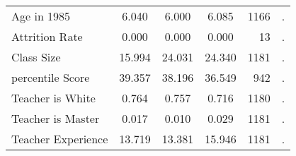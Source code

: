 \documentclass{article}
\begin{document}
\begin{table}[htbp]
\begin{tabular}{llcccrc}
    \multicolumn{2}{l}{Age in 1985} & 6.040  & 6.000  & 6.085  & 1166  & . \\
    \multicolumn{2}{l}{Attrition Rate} & 0.000  & 0.000  & 0.000  & 13    & . \\
    \multicolumn{2}{l}{Class Size} & 15.994  & 24.031  & 24.340  & 1181  & . \\
    \multicolumn{2}{l}{percentile Score} & 39.357  & 38.196  & 36.549  & 942   & . \\
    \multicolumn{2}{l}{Teacher is White} & 0.764  & 0.757  & 0.716  & 1180  & . \\
    \multicolumn{2}{l}{Teacher is Master} & 0.017  & 0.010  & 0.029  & 1181  & . \\
    \multicolumn{2}{l}{Teacher Experience} & 13.719  & 13.381  & 15.946  & 1181  & . \\
    \bottomrule
    \bottomrule
    \end{tabular}%
  \label{tab:addlabel}%
\end{table}%


\end{document}
